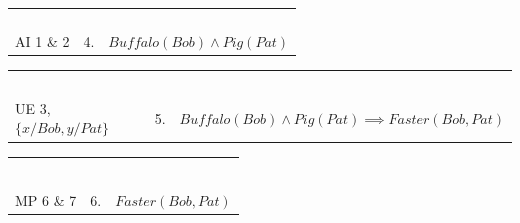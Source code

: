 \documentclass[fleqn]{article}
\begin{document}
\begin{huge}

\begin{tabular}{l|ll}
\phantom{Bob là một con trâu} & & \\
\phantom{UE 3, $\{x/Bob,y/Pat\}$} & & \\
\phantom{Trâu chạy nhanh hơn lợn} & & \\
\hline
\phantom{Bob chạy nhanh hơn Pat} & & \phantom{$Buffalo(Bob) \land Pig(Pat) \implies Faster(Bob,Pat)$}\\
\hline
AI 1 \& 2 & 4. & $Buffalo(Bob) \land Pig(Pat)$ \\
\end{tabular}




\begin{tabular}{l|ll}
\phantom{Bob là một con trâu} & & \\
\phantom{Pat là một con lợn} & & \\
\phantom{Trâu chạy nhanh hơn lợn} & & \\
\hline
\phantom{Bob chạy nhanh hơn Pat} & & \phantom{$Buffalo(Bob) \land Pig(Pat) \implies Faster(Bob,Pat)$}\\
\hline
\phantom{AI 1 \& 2} & & \\
UE 3, $\{x/Bob,y/Pat\}$ & 5. & $Buffalo(Bob) \land Pig(Pat) \implies Faster(Bob,Pat)$\\
\end{tabular}


\begin{tabular}{l|ll}
\phantom{Bob là một con trâu} & & \\
\phantom{Pat là một con lợn} & & \\
\phantom{Trâu chạy nhanh hơn lợn} & & \\
\hline
\phantom{Bob chạy nhanh hơn Pat} & & \phantom{$Buffalo(Bob) \land Pig(Pat) \implies Faster(Bob,Pat)$} \\
\hline
\phantom{AI 1 \& 2} & & \\
\phantom{UE 3, $\{x/Bob,y/Pat\}$} & & \\
MP 6 \& 7 & 6. & $Faster(Bob,Pat)$ \\
\end{tabular}



\end{huge}
\end{document}
